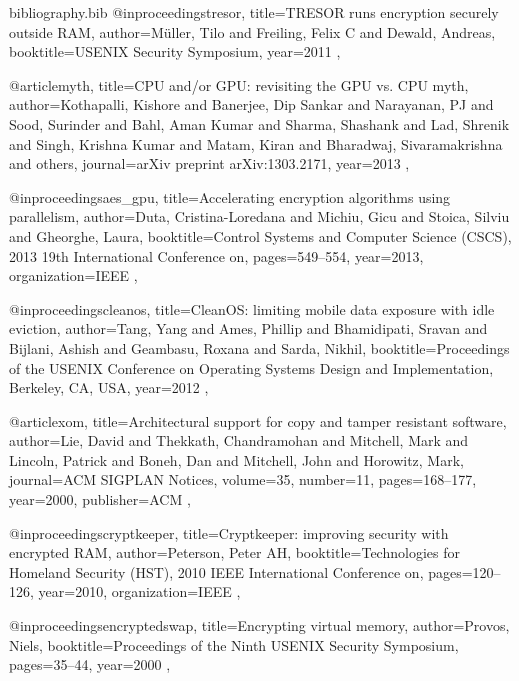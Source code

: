 \documentclass[conference,10pt]{IEEEtran}
\begin{document}
\begin{filecontents*}{bibliography.bib}
    @inproceedings{tresor,
        title={{TRESOR runs encryption securely outside RAM}},
        author={M{\"u}ller, Tilo and Freiling, Felix C and Dewald, Andreas},
        booktitle={USENIX Security Symposium},
        year={2011}
    },

    @article{myth,
        title={{CPU and/or GPU: revisiting the GPU vs. CPU myth}},
        author={Kothapalli, Kishore and Banerjee, Dip Sankar and Narayanan, PJ and Sood, Surinder and 
            Bahl, Aman Kumar and Sharma, Shashank and Lad, Shrenik and Singh, Krishna Kumar and Matam, Kiran 
        and Bharadwaj, Sivaramakrishna and others},
        journal={arXiv preprint arXiv:1303.2171},
        year={2013}
    },

    @inproceedings{aes_gpu,
        title={Accelerating encryption algorithms using parallelism},
        author={Duta, Cristina-Loredana and Michiu, Gicu and Stoica, Silviu and Gheorghe, Laura},
        booktitle={Control Systems and Computer Science (CSCS), 2013 19th International Conference on},
        pages={549--554},
        year={2013},
        organization={IEEE}
    },

    @inproceedings{cleanos,
        title={{CleanOS: limiting mobile data exposure with idle eviction}},
        author={Tang, Yang and Ames, Phillip and Bhamidipati, Sravan and Bijlani, Ashish and Geambasu, 
        Roxana and Sarda, Nikhil},
        booktitle={Proceedings of the USENIX Conference on Operating Systems Design and Implementation, 
        Berkeley, CA, USA},
        year={2012}
    },

    @article{xom,
        title={Architectural support for copy and tamper resistant software},
        author={Lie, David and Thekkath, Chandramohan and Mitchell, Mark and Lincoln, Patrick and Boneh, Dan and Mitchell, John and Horowitz, Mark},
        journal={ACM SIGPLAN Notices},
        volume={35},
        number={11},
        pages={168--177},
        year={2000},
        publisher={ACM}
    },

    @inproceedings{cryptkeeper,
        title={Cryptkeeper: improving security with encrypted RAM},
        author={Peterson, Peter AH},
        booktitle={Technologies for Homeland Security (HST), 2010 IEEE International Conference on},
        pages={120--126},
        year={2010},
        organization={IEEE}
    },

    @inproceedings{encryptedswap,
        title={Encrypting virtual memory},
        author={Provos, Niels},
        booktitle={Proceedings of the Ninth USENIX Security Symposium},
        pages={35--44},
        year={2000}
    },


\end{filecontents*}
\end{document}

